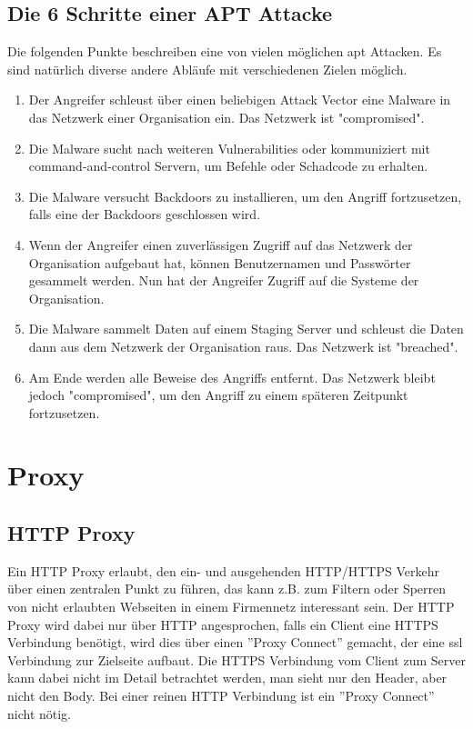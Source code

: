 \subsection{Die 6 Schritte einer APT Attacke}
Die folgenden Punkte\cite{curthreat} beschreiben eine von vielen möglichen \gls{apt} Attacken. Es sind natürlich diverse andere Abläufe mit verschiedenen Zielen möglich.

\begin{enumerate}
	\item Der Angreifer schleust über einen beliebigen Attack Vector eine Malware in das Netzwerk einer Organisation ein. Das Netzwerk ist "compromised".
	\item Die Malware sucht nach weiteren Vulnerabilities oder kommuniziert mit command-and-control Servern, um Befehle oder Schadcode zu erhalten.
	\item Die Malware versucht Backdoors zu installieren, um den Angriff fortzusetzen, falls eine der Backdoors geschlossen wird.
	\item Wenn der Angreifer einen zuverlässigen Zugriff auf das Netzwerk der Organisation aufgebaut hat, können Benutzernamen und Passwörter gesammelt werden. Nun hat der Angreifer Zugriff auf die Systeme der Organisation.
	\item Die Malware sammelt Daten auf einem Staging Server und schleust die Daten dann aus dem Netzwerk der Organisation raus. Das Netzwerk ist "breached".
	\item Am Ende werden alle Beweise des Angriffs entfernt. Das Netzwerk bleibt jedoch "compromised", um den Angriff zu einem späteren Zeitpunkt fortzusetzen.
\end{enumerate}

\section{Proxy}
\label{analyse:httpproxy}
\subsection{HTTP Proxy}
Ein HTTP Proxy\cite{wiki:proxy} erlaubt, den ein- und ausgehenden HTTP/HTTPS Verkehr über einen zentralen Punkt zu führen, das kann z.B. zum Filtern oder Sperren von nicht erlaubten Webseiten in einem Firmennetz interessant sein.
Der HTTP Proxy wird dabei nur über HTTP angesprochen, falls ein Client eine HTTPS Verbindung benötigt, wird dies über einen ''Proxy Connect'' \cite{rfc2817} gemacht, der eine \gls{ssl} Verbindung zur Zielseite aufbaut.
Die HTTPS Verbindung vom Client zum Server kann dabei nicht im Detail betrachtet werden, man sieht nur den Header, aber nicht den Body.
Bei einer reinen HTTP Verbindung ist ein ''Proxy Connect'' nicht nötig.

